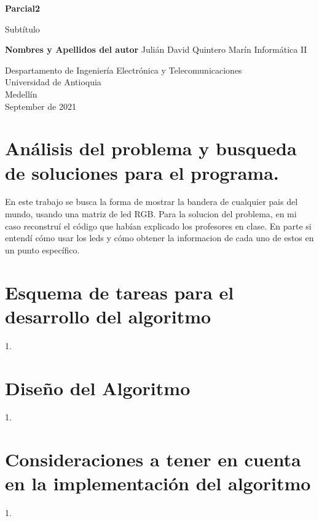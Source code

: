 \documentclass{article}
\begin{document}
\begin{titlepage}
    \begin{center}
        \vspace*{1cm}
            
        \Huge
        \textbf{Parcial2}
            
        \vspace{0.5cm}
        \LARGE
        Subtítulo
            
        \vspace{1.5cm}
            
        \textbf{Nombres y Apellidos del autor}
        \newline Julián David Quintero Marín
        \newline
        \newline
        Informática II
        \vfill
            
        \vspace{0.8cm}
            
        \Large
        Despartamento de Ingeniería Electrónica y Telecomunicaciones\\
        Universidad de Antioquia\\
        Medellín\\
        September de 2021
            
    \end{center}
\end{titlepage}

\tableofcontents
\newpage
\section{Análisis del problema y busqueda de soluciones para el programa.}\label{intro}
En este trabajo se busca la forma de mostrar la bandera de cualquier pais del mundo, usando una matriz de led RGB.
Para la solucion del problema, en mi caso reconstruí el código que habían explicado los profesores en clase. En parte si entendí cómo usar los leds y cómo obtener la informacion de cada uno de estos en un punto específico.

\section{Esquema de tareas para el desarrollo del algoritmo} \label{contenido}
1.
\newline
\section{Diseño del Algoritmo} \label{contenido}
1. 
\newline
\section{Consideraciones a tener en cuenta en la implementación del algoritmo} \label{contenido}
1. 
\newline




\end{document}

